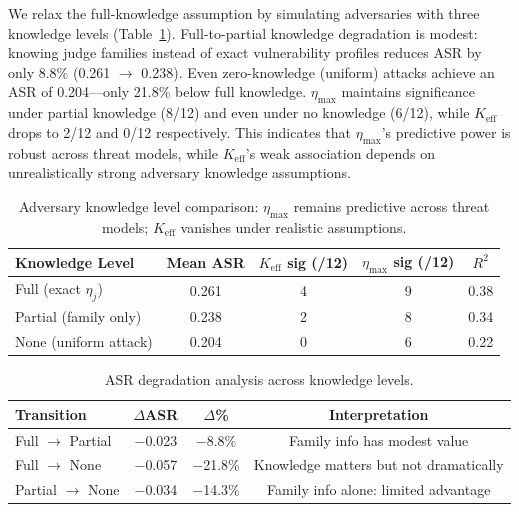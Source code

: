 \documentclass[11pt,a4paper]{article}
\begin{document}
We relax the full-knowledge assumption by simulating adversaries with three knowledge levels (Table~\ref{tab:partial}).
Full-to-partial knowledge degradation is modest: knowing judge families instead of exact vulnerability profiles reduces ASR by only 8.8\% (0.261 $\to$ 0.238).
Even zero-knowledge (uniform) attacks achieve an ASR of 0.204---only 21.8\% below full knowledge.
$\eta_{\max}$ maintains significance under partial knowledge (8/12) and even under no knowledge (6/12), while $K_{\mathrm{eff}}$ drops to 2/12 and 0/12 respectively.
This indicates that $\eta_{\max}$'s predictive power is robust across threat models, while $K_{\mathrm{eff}}$'s weak association depends on unrealistically strong adversary knowledge assumptions.

\begin{table}[t]
\centering
\caption{Adversary knowledge level comparison: $\eta_{\max}$ remains predictive across threat models; $K_{\mathrm{eff}}$ vanishes under realistic assumptions.}
\label{tab:partial}
\small
\begin{tabular}{lcccc}
\toprule
\textbf{Knowledge Level} & \textbf{Mean ASR} & $K_{\mathrm{eff}}$ \textbf{sig (/12)} & $\eta_{\max}$ \textbf{sig (/12)} & $R^2$ \\
\midrule
Full (exact $\eta_j$) & 0.261 & 4 & 9 & 0.38 \\
Partial (family only) & 0.238 & 2 & 8 & 0.34 \\
None (uniform attack) & 0.204 & 0 & 6 & 0.22 \\
\bottomrule
\end{tabular}
\end{table}

\begin{table}[t]
\centering
\caption{ASR degradation analysis across knowledge levels.}
\label{tab:partial_degrade}
\small
\begin{tabular}{lccc}
\toprule
\textbf{Transition} & $\Delta$\textbf{ASR} & $\Delta$\% & \textbf{Interpretation} \\
\midrule
Full $\to$ Partial & $-$0.023 & $-$8.8\% & Family info has modest value \\
Full $\to$ None & $-$0.057 & $-$21.8\% & Knowledge matters but not dramatically \\
Partial $\to$ None & $-$0.034 & $-$14.3\% & Family info alone: limited advantage \\
\bottomrule
\end{tabular}
\end{table}

\end{document}
